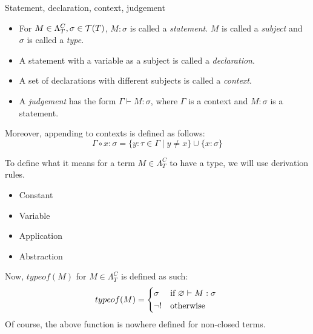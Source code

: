 \documentclass[main.tex]{subfiles}
\begin{document}
\begin{defn}
    Statement, declaration, context, judgement \cite[chap.~2.4]{ttfp}
    \begin{itemize}
        \item For $M \in \Lambda_T^C, \sigma \in \mathcal{T}( T )$, $M : \sigma$ is called
            a \emph{statement}. $M$ is called a \emph{subject} and $\sigma$
            is called a \emph{type}.
        \item A statement with a variable as a subject is called a \emph{declaration}.
        \item A set of declarations with different subjects is called a \emph{context}.
        \item A \emph{judgement} has the form $\Gamma \vdash M: \sigma$, where
            $\Gamma$ is a context and $M: \sigma$ is a statement.
    \end{itemize}

    Moreover, appending to contexts is defined as follows:
    \[ \Gamma \circ x : \sigma = \{ y : \tau \in \Gamma \mid y \neq x \}
       \cup \{ x : \sigma \} \]
\end{defn}

\begin{defn}
    To define what it means for a term $M \in \Lambda_T^C$ to have a type,
    we will use derivation rules.
    \begin{itemize}
        \item Constant
        \item Variable
        \item Application
        \item Abstraction
    \end{itemize}

    Now, $typeof(M)$ for $M \in \Lambda_T^C$ is defined as such:
    \[
        typeof(M) =
        \begin{cases*}
            \sigma & if $\varnothing \vdash M : \sigma$ \\
            \neg ! & otherwise
        \end{cases*}
    \]
    Of course, the above function is nowhere defined for non-closed terms.
\end{defn}
\end{document}
